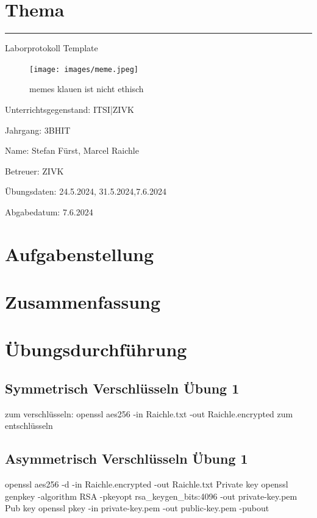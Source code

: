 \documentclass[a4paper]{article}
\begin{document}

\pagestyle{oida}
\section*{Thema}
\par\noindent\rule{\textwidth}{0.4pt}

Laborprotokoll
Template

\begin{figure}[h]
	\texttt{[image: images/meme.jpeg]}
	\caption{memes klauen ist nicht ethisch}
\end{figure}

\vspace*{\fill}
Unterrichtsgegenstand:	ITSI|ZIVK

Jahrgang:	3BHIT

Name:	Stefan Fürst, Marcel Raichle

Betreuer: 	ZIVK

Übungsdaten:	24.5.2024, 31.5.2024,7.6.2024

Abgabedatum:	7.6.2024


\newpage
\tableofcontents

\newpage

\section{Aufgabenstellung}



\section{Zusammenfassung}


\newpage

\section{Übungsdurchführung}

\subsection{Symmetrisch Verschlüsseln Übung 1}
zum verschlüsseln:
openssl aes256 -in Raichle.txt -out Raichle.encrypted
zum entschlüsseln

\subsection{Asymmetrisch Verschlüsseln Übung 1}
openssl aes256 -d -in Raichle.encrypted -out Raichle.txt
Private key
openssl genpkey -algorithm RSA -pkeyopt rsa_keygen_bits:4096 -out private-key.pem
Pub key
openssl pkey -in private-key.pem -out public-key.pem -pubout
\end{document}
